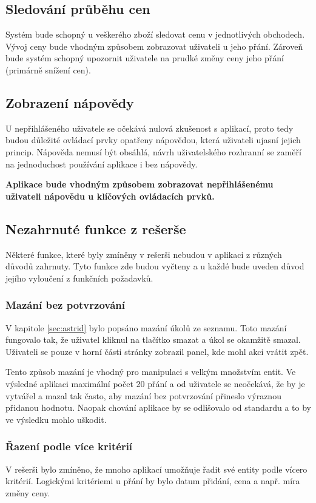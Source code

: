 \subsection{Sledování průběhu cen}
Systém bude schopný u veškerého zboží sledovat cenu v jednotlivých obchodech. Vývoj ceny bude vhodným způsobem zobrazovat uživateli u jeho přání. Zároveň bude systém schopný upozornit uživatele na prudké změny ceny jeho přání (primárně snížení cen).

\subsection{Zobrazení nápovědy}
U nepřihlášeného uživatele se očekává nulová zkušenost s aplikací, proto tedy budou důležité ovládací prvky opatřeny nápovědou, která uživateli ujasní jejich princip. Nápověda nemusí být obsáhlá, návrh uživatelského rozhranní se zaměří na jednoduchost používání aplikace i bez nápovědy.

\textbf{Aplikace bude vhodným způsobem zobrazovat nepřihlášenému uživateli nápovědu u klíčových ovládacích prvků.}

\subsection{Nezahrnuté funkce z rešerše}
Některé funkce, které byly zmíněny v rešerši nebudou v aplikaci z různých důvodů zahrnuty. Tyto funkce zde budou vyčteny a u každé bude uveden důvod jejího vyloučení z funkčních požadavků.

\subsubsection{Mazání bez potvrzování}
V kapitole \ref{sec:astrid} bylo popsáno mazání úkolů ze seznamu. Toto mazání fungovalo tak, že uživatel kliknul na tlačítko smazat a úkol se okamžitě smazal. Uživateli se pouze v horní části stránky zobrazil panel, kde mohl akci vrátit zpět.

Tento způsob mazání je vhodný pro manipulaci s velkým množstvím entit. Ve výsledné aplikaci maximální počet 20 přání a od uživatele se neočekává, že by je vytvářel a mazal tak často, aby mazání bez potvrzování přineslo výraznou přidanou hodnotu. Naopak chování aplikace by se odlišovalo od standardu a to by ve výsledku mohlo uškodit.

\subsubsection{Řazení podle více kritérií}
V rešerši bylo zmíněno, že mnoho aplikací umožňuje řadit své entity podle vícero kritérií. Logickými kritériemi u přání by bylo datum přidání, cena a např. míra změny ceny.

